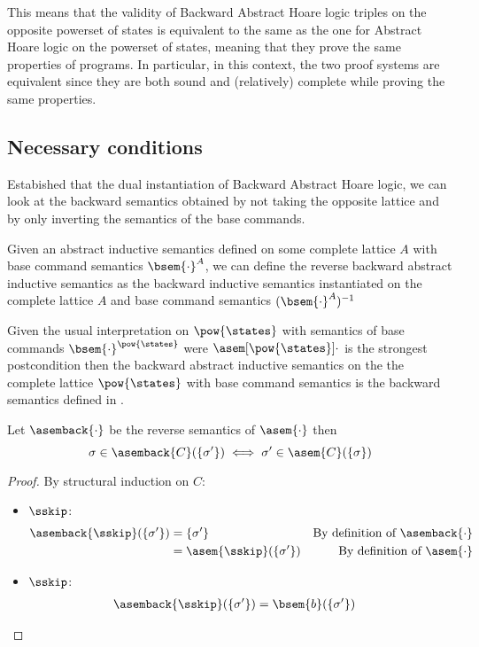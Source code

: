 
This means that the validity of Backward Abstract Hoare logic triples on the
opposite powerset of states is equivalent to the same as the one for Abstract 
Hoare logic on the powerset of states, meaning that they prove the same 
properties of programs. In particular, in this context, the two proof systems 
are equivalent since they are both sound and (relatively) complete while 
proving the same properties.

\subsection{Necessary conditions}
Estabished that the dual instantiation of Backward Abstract Hoare logic, we can
look at the backward semantics obtained by not taking the opposite lattice and
by only inverting the semantics of the base commands.

\begin{definition}
  Given an abstract inductive semantics defined on some complete lattice $A$ 
  with base command semantics $\bsem{\cdot}^A$, we can define the reverse
  backward abstract inductive semantics as the backward inductive semantics
  instantiated on the complete lattice $A$ and base command semantics 
  $(\bsem{\cdot}^A)^{-1}$
\end{definition}

Given the usual interpretation on $\pow{\states}$ with semantics of base 
commands $\bsem{\cdot}^{\pow{\states}}$ were $\asem[\pow{\states}]{\cdot}$ is the 
strongest postcondition then the backward abstract inductive semantics on the
the complete lattice $\pow{\states}$ with base command semantics 
 is the backward semantics defined in
\cite{Ascari24}.

\begin{theorem}
  Let $\asemback{\cdot}$ be the reverse semantics of $\asem{\cdot}$ then
  $$\sigma \in \asemback{C}(\{ \sigma' \}) \iff \sigma' \in \asem{C}(\{\sigma\})$$
\end{theorem}
\begin{proof}
  By structural induction on $C$:
  \begin{itemize}
    \item $\sskip$:
      \begin{align*}
        \asemback{\sskip}(\{\sigma'\})
          &= \{\sigma'\}
          &\text{By definition of $\asemback{\cdot}$} \\
          &= \asem{\sskip}(\{\sigma' \})
          &\text{By definition of $\asem{\cdot}$} \\
      \end{align*}
    
    \item $\sskip$:
      \begin{align*}
        \asemback{\sskip}(\{\sigma'\})
          &= \bsem{b}(\{\sigma' \})
      \end{align*}
  \end{itemize}
\end{proof}

